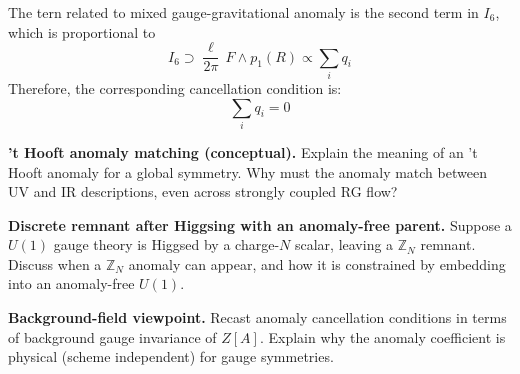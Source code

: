 \begin{solution}[28.5]
	The tern related to mixed gauge-gravitational anomaly is the second term in $I_6$, which is proportional to
	\[
	I_6\supset \frac{\ell}{2\pi}\,F \wedge p_1(R) \propto\sum_i q_i
	\]
	Therefore, the corresponding cancellation condition is:
	\[
	\boxed{
	\sum_i q_i=0
	}
	\]
\end{solution}
\begin{problem}
    \textbf{’t Hooft anomaly matching (conceptual).} Explain the meaning of an ’t Hooft anomaly for a global symmetry. Why must the anomaly match between UV and IR descriptions, even across strongly coupled RG flow?
\end{problem}
\begin{problem}
    \textbf{Discrete remnant after Higgsing with an anomaly-free parent.} Suppose a \(U(1)\) gauge theory is Higgsed by a charge-\(N\) scalar, leaving a \(\mathbb{Z}_N\) remnant. Discuss when a \(\mathbb{Z}_N\) anomaly can appear, and how it is constrained by embedding into an anomaly-free \(U(1)\).
\end{problem}
\begin{problem}
    \textbf{Background-field viewpoint.} Recast anomaly cancellation conditions in terms of background gauge invariance of \(Z[A]\). Explain why the anomaly coefficient is physical (scheme independent) for gauge symmetries.
\end{problem}
